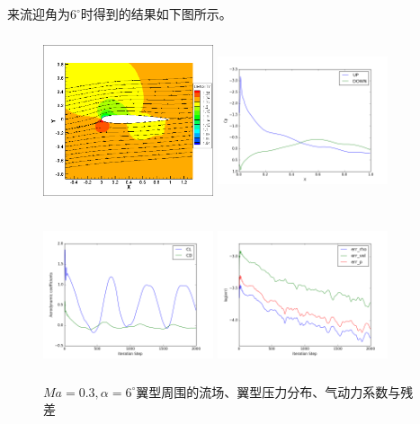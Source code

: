 \documentclass[UTF8]{ctexart}
\begin{document}
\indent 来流迎角为$6^\circ$时得到的结果如下图所示。
\begin{figure}[H]\centering
  \begin{minipage}{5.5cm}
    \centering
    \includegraphics[height=5cm,width=5cm]{../pic/0.3_6_flowfield.png}
  \end{minipage}%
  \begin{minipage}{5.5cm}
    \centering
    \includegraphics[height=5cm,width=5cm]{../pic/0.3_6_Cp.png}
  \end{minipage}

  \begin{minipage}{5.5cm}
    \centering
    \includegraphics[height=5cm,width=5cm]{../pic/0.3_6_cl_cd.png}
  \end{minipage}%
  \begin{minipage}{5.5cm}
    \centering
    \includegraphics[height=5cm,width=5cm]{../pic/0.3_6_residual.png}
  \end{minipage}
  \caption{$Ma=0.3,\alpha=6^\circ$翼型周围的流场、翼型压力分布、气动力系数与残差}
\end{figure}
\end{document}
